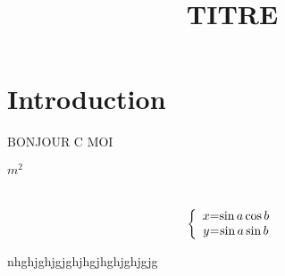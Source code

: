 \documentclass[12pt]{article}
\begin{document}
\title{TITRE}
\author{}

\maketitle
{}

\tableofcontents

\section{Introduction}

BONJOUR C MOI

$m^2$


\section{}


\[
\left \{
\begin{array}{c @{=} c}
    x & \sin a \cos b \\
    y & \sin a \sin b \\
\end{array}
\right.
\]

nhghjghjgjghjhgjhghjghjgjg






\section{}







\begin{thebibliography}{99}

\bibitem{} 

\bibitem{}


\bibitem{}

\end{thebibliography}
\end{document}
